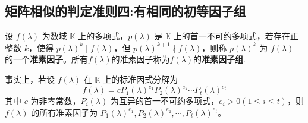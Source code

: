 \documentclass[../../main.tex]{subfiles}
\begin{document}
\subsection{矩阵相似的判定准则四:有相同的初等因子组}

\begin{definition}[准素因子]\label{definition:一般数域上的的准素因子}
设 \(f(\lambda)\) 为数域 \(\mathbb{K}\) 上的多项式，\(p(\lambda)\) 是 \(\mathbb{K}\) 上的首一不可约多项式，若存在正整数 \(k\)，使得 \(p(\lambda)^k\mid f(\lambda)\)，但 \(p(\lambda)^{k + 1}\nmid f(\lambda)\)，则称 \(p(\lambda)^k\) 为 \(f(\lambda)\) 的一个\textbf{准素因子}。所有$f(\lambda)$的准素因子称为$f(\lambda)$的\textbf{准素因子组}.

事实上，若设 \(f(\lambda)\) 在 \(\mathbb{K}\) 上的标准因式分解为
\[
f(\lambda)=cP_1(\lambda)^{e_1}P_2(\lambda)^{e_2}\cdots P_t(\lambda)^{e_t}
\]
其中 \(c\) 为非零常数，\(P_i(\lambda)\) 为互异的首一不可约多项式，\(e_i>0(1\leqslant  i\leqslant  t)\)，则 \(f(\lambda)\) 的所有准素因子为 \(P_1(\lambda)^{e_1},P_2(\lambda)^{e_2},\cdots,P_t(\lambda)^{e_t}\)。
\end{definition}
\end{document}
